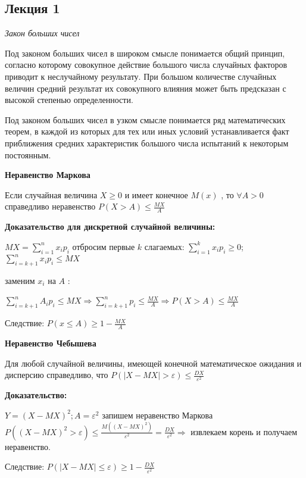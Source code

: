 \subsection{Лекция 1}

\textit{Закон больших чисел}

Под законом больших чисел в широком смысле понимается общий принцип, согласно которому совокупное действие большого числа случайных факторов приводит к неслучайному результату.
При большом количестве случайных величин средний результат их совокупного влияния может быть предсказан с высокой степенью определенности.

Под законом больших чисел в узком смысле понимается ряд математических теорем, в каждой из которых для тех или иных условий устанавливается факт приближения средних характеристик большого числа испытаний к некоторым постоянным.

\begin{center}
    \textbf{Неравенство Маркова}
\end{center} 

Если случайная величина $X \ge 0$ и имеет конечное $M(x)$ , то $\forall A > 0$ справедливо неравенство $P(X>A) \le \frac{MX}{A}$

\textbf{Доказательство для дискретной случайной величины: }

$ MX=\sum \limits_{i=1}^{n}{x_i p_i} $ отбросим первые $k$ слагаемых: $ \sum \limits_{i=1}^{k}{x_i p_i} \ge 0 $; $ \sum \limits_{i=k+1}^{n}{x_i p_i} \le MX $ 

заменим $x_i$ на $A$ :

$ \sum \limits_{i=k+1}^{n}{A_i p_i} \le MX \Rightarrow \sum \limits_{i=k+1}^{n}{p_i} \le \frac{MX}{A} \Rightarrow P(X>A) \le \frac{MX}{A} $\

Следствие: $P(x \le A) \ge 1 - \frac{MX}{A}$

\begin{center}
    \textbf{Неравенство Чебышева}
\end{center} 

Для любой случайной величины, имеющей конечной математическое ожидания и дисперсию справедливо, что $P(|X-MX|>\varepsilon) \le \frac{DX}{\varepsilon^2}$

\textbf{Доказательство: }

$Y=(X-MX)^2;A=\varepsilon^2$ запишем неравенство Маркова $P((X-MX)^2 > \varepsilon) \le \frac{M((X-MX)^2)}{\varepsilon^2} = \frac{DX}{\varepsilon^2} \Rightarrow$ извлекаем корень и получаем неравенство.

Следствие: $P(|X-MX| \le \varepsilon) \ge 1 - \frac{DX}{\varepsilon^2}$

